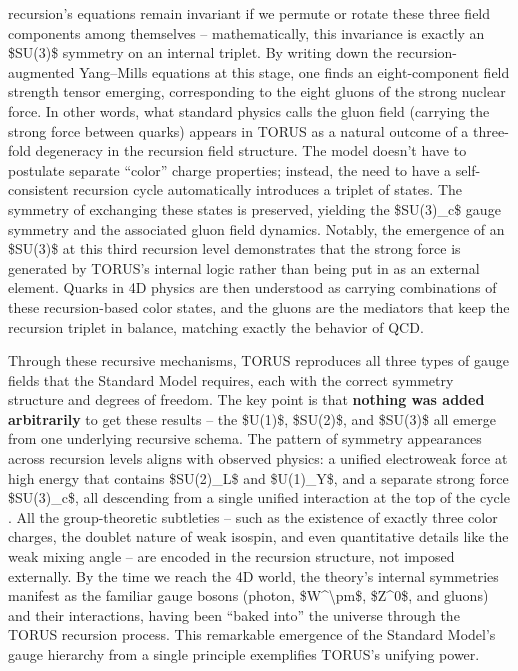 \documentclass[]{article}
\begin{document}
\begin{itemize}
  recursion's equations remain invariant if we permute or rotate these
  three field components among themselves -- mathematically, this
  invariance is exactly an \$SU(3)\$ symmetry on an internal triplet​.
  By writing down the recursion-augmented Yang--Mills equations at this
  stage, one finds an eight-component field strength tensor emerging,
  corresponding to the eight gluons of the strong nuclear force​. In
  other words, what standard physics calls the gluon field (carrying the
  strong force between quarks) appears in TORUS as a natural outcome of
  a three-fold degeneracy in the recursion field structure​. The model
  doesn't have to postulate separate ``color'' charge properties;
  instead, the need to have a self-consistent recursion cycle
  automatically introduces a triplet of states. The symmetry of
  exchanging these states is preserved, yielding the \$SU(3)\_c\$ gauge
  symmetry and the associated gluon field dynamics​. Notably, the
  emergence of an \$SU(3)\$ at this third recursion level demonstrates
  that the strong force is generated by TORUS's internal logic rather
  than being put in as an external element​. Quarks in 4D physics are
  then understood as carrying combinations of these recursion-based
  color states, and the gluons are the mediators that keep the recursion
  triplet in balance, matching exactly the behavior of QCD.
\end{itemize}

Through these recursive mechanisms, TORUS reproduces all three types of
gauge fields that the Standard Model requires, each with the correct
symmetry structure and degrees of freedom. The key point is that
\textbf{nothing was added arbitrarily} to get these results -- the
\$U(1)\$, \$SU(2)\$, and \$SU(3)\$ all emerge from one underlying
recursive schema. The pattern of symmetry appearances across recursion
levels aligns with observed physics: a unified electroweak force at high
energy that contains \$SU(2)\_L\$ and \$U(1)\_Y\$, and a separate strong
force \$SU(3)\_c\$, all descending from a single unified interaction at
the top of the cycle​. All the group-theoretic subtleties -- such as the
existence of exactly three color charges, the doublet nature of weak
isospin, and even quantitative details like the weak mixing angle -- are
encoded in the recursion structure, not imposed externally​. By the time
we reach the 4D world, the theory's internal symmetries manifest as the
familiar gauge bosons (photon, \$W\^{}\textbackslash{}pm\$, \$Z\^{}0\$,
and gluons) and their interactions, having been ``baked into'' the
universe through the TORUS recursion process. This remarkable emergence
of the Standard Model's gauge hierarchy from a single principle
exemplifies TORUS's unifying power.
\end{document}
